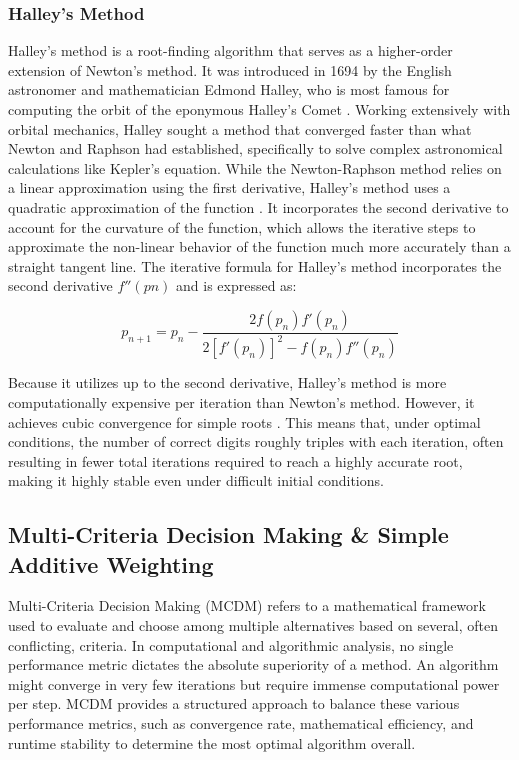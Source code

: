 \documentclass[a4paper,11pt]{article}
\begin{document}
\subsubsection{Halley's Method}

Halley's method is a root-finding algorithm that serves as a higher-order extension of Newton's method. It was introduced in 1694 by the English astronomer and mathematician Edmond Halley, who is most famous for computing the orbit of the eponymous Halley's Comet \parencite{scavo1995geometry}. Working extensively with orbital mechanics, Halley sought a method that converged faster than what Newton and Raphson had established, specifically to solve complex astronomical calculations like Kepler's equation. While the Newton-Raphson method relies on a linear approximation using the first derivative, Halley's method uses a quadratic approximation of the function \parencite{scavo1995geometry}. It incorporates the second derivative to account for the curvature of the function, which allows the iterative steps to approximate the non-linear behavior of the function much more accurately than a straight tangent line. The iterative formula for Halley's method incorporates the second derivative $f''(pn)$ and is expressed as:

\begin{equation*}
    p_{n+1} = p_n - \dfrac{2f(p_n) f'(p_n)}{2[f'(p_n)]^2 - f(p_n) f''(p_n)}
\end{equation*}

Because it utilizes up to the second derivative, Halley's method is more computationally expensive per iteration than Newton's method. However, it achieves cubic convergence for simple roots \parencite{burden2016numerical}. This means that, under optimal conditions, the number of correct digits roughly triples with each iteration, often resulting in fewer total iterations required to reach a highly accurate root, making it highly stable even under difficult initial conditions.


\subsection{ Multi-Criteria Decision Making \& Simple Additive Weighting}

Multi-Criteria Decision Making (MCDM) refers to a mathematical framework used to evaluate and choose among multiple alternatives based on several, often conflicting, criteria. In computational and algorithmic analysis, no single performance metric dictates the absolute superiority of a method. An algorithm might converge in very few iterations but require immense computational power per step. MCDM provides a structured approach to balance these various performance metrics, such as convergence rate, mathematical efficiency, and runtime stability to determine the most optimal algorithm overall.
\end{document}
